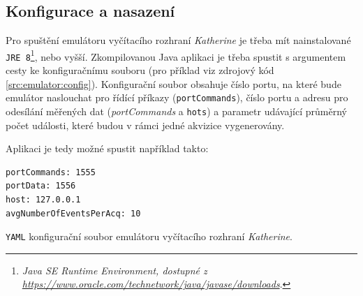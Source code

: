 \subsection{Konfigurace a nasazení}
Pro spuštění emulátoru vyčítacího rozhraní \textit{Katherine} je třeba mít nainstalované \texttt{JRE 8}\footnote{\textit{Java SE Runtime Environment, dostupné z\\\url{https://www.oracle.com/technetwork/java/javase/downloads}}.}, nebo vyšší.
Zkompilovanou Java aplikaci je třeba spustit s argumentem cesty ke konfiguračnímu souboru (pro příklad viz zdrojový kód \ref{src:emulator:config}). Konfigurační soubor obsahuje číslo portu, na které bude emulátor naslouchat pro řídící příkazy (\texttt{portCommands}), číslo portu a adresu pro odesílání měřených dat (\textit{portCommands} a \texttt{hots}) a parametr udávající průměrný počet události, které budou v rámci jedné akvizice vygenerovány.

Aplikaci je tedy možné spustit například takto: 

\begin{code}[h]
  \begin{verbatim}
portCommands: 1555
portData: 1556
host: 127.0.0.1
avgNumberOfEventsPerAcq: 10
\end{verbatim}
\caption{\texttt{YAML} konfigurační soubor emulátoru vyčítacího rozhraní \textit{Katherine}.}
\label{src:emulator:config}
\end{code}